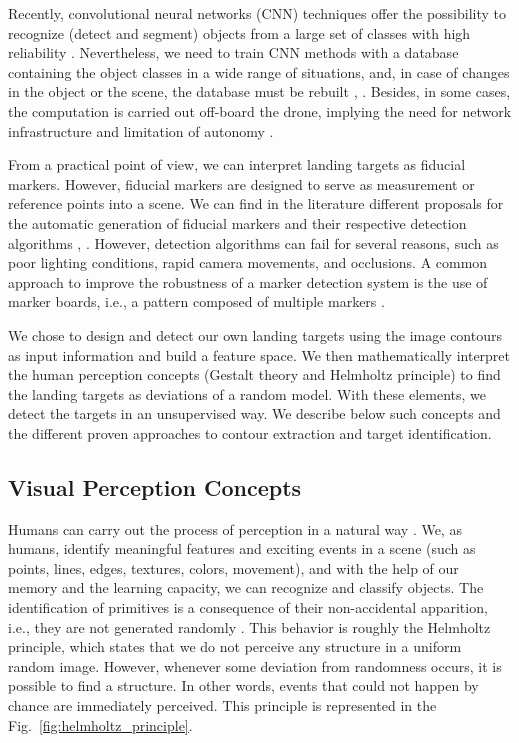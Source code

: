 Recently, convolutional neural networks (CNN) techniques offer the possibility to recognize (detect and segment) objects from a large set of classes with high reliability \citep{Carrio.Sampedro.ea:JS:2017}. Nevertheless, we need to train CNN methods with a database containing the object classes in a wide range of situations, and, in case of changes in the object or the scene, the database must be rebuilt \citep{Yao.Yu.ea:CCC:2017}, \citep{Furukawa:TechRep:2018}. Besides, in some cases, the computation is carried out off-board the drone, implying the need for network infrastructure and limitation of autonomy \citep{Lee.Wang.ea:IRC:2017}.

From a practical point of view, we can interpret landing targets as fiducial markers. However, fiducial markers are designed to serve as measurement or reference points into a scene. We can find in the literature different proposals for the automatic generation of fiducial markers and their respective detection algorithms \citep{Fiala:PAMI:2010}, \citep{Naimark.Foxlin:ISMAR:2002}. However, detection algorithms can fail for several reasons, such as poor lighting conditions, rapid camera movements, and occlusions. A common approach to improve the robustness of a marker detection system is the use of marker boards, i.e., a pattern composed of multiple markers \citep{Garrido-Jurado.Munoz-Salinas.ea:PR:2014}. 

We chose to design and detect our own landing targets using the image contours as input information and build a feature space. We then mathematically interpret the human perception concepts (Gestalt theory and Helmholtz principle) to find the landing targets as deviations of a random model.  With these elements, we detect the targets in an unsupervised way. We describe below such concepts and the different proven approaches to contour extraction and target identification.


\subsection{Visual Perception Concepts}
Humans can carry out the process of perception in a natural way \citep{Petitot:Neurogeometrie:2008}. We, as humans, identify meaningful features and exciting events in a scene (such as points, lines, edges, textures, colors, movement), and with the help of our memory and the learning capacity, we can recognize and classify objects. The identification of primitives is a consequence of their non-accidental apparition, i.e., they are not generated randomly \citep{Attneave:PR:1954}. This behavior is roughly the Helmholtz principle, which states that we do not perceive any structure in a uniform random image. However, whenever some deviation from randomness occurs, it is possible to find a structure. In other words, events that could not happen by chance are immediately perceived. This principle is represented in the Fig.\ \ref{fig:helmholtz_principle}.

